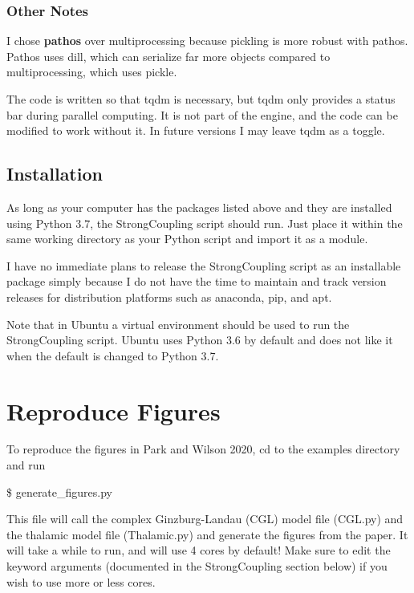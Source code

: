 \documentclass[english,a4paper,oneside]{article}
\begin{document}
\hypertarget{other-notes}{%
\subsubsection{Other Notes}\label{other-notes}}

I chose \textbf{pathos} over multiprocessing because pickling is more
robust with pathos. Pathos uses dill, which can serialize far more
objects compared to multiprocessing, which uses pickle.

The code is written so that tqdm is necessary, but tqdm only provides a
status bar during parallel computing. It is not part of the engine, and
the code can be modified to work without it. In future versions I may
leave tqdm as a toggle.

\hypertarget{installation}{%
\subsection{Installation}\label{installation}}

As long as your computer has the packages listed above and they are
installed using Python 3.7, the StrongCoupling script should run. Just
place it within the same working directory as your Python script and
import it as a module.

I have no immediate plans to release the StrongCoupling script as an
installable package simply because I do not have the time to maintain
and track version releases for distribution platforms such as anaconda,
pip, and apt.

Note that in Ubuntu a virtual environment should be used to run the
StrongCoupling script. Ubuntu uses Python 3.6 by default and does not
like it when the default is changed to Python 3.7.

\hypertarget{reproduce-figures}{%
\section{Reproduce Figures}\label{reproduce-figures}}

To reproduce the figures in Park and Wilson 2020, cd to the examples
directory and run

\$ generate\_figures.py

This file will call the complex Ginzburg-Landau (CGL) model file
(CGL.py) and the thalamic model file (Thalamic.py) and generate the
figures from the paper. It will take a while to run, and will use 4
cores by default! Make sure to edit the keyword arguments (documented in
the StrongCoupling section below) if you wish to use more or less cores.
\end{document}
